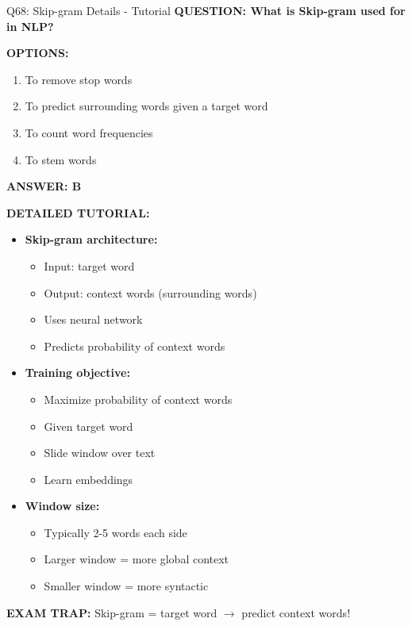 \documentclass[8pt]{beamer}
\begin{document}
	\begin{frame}{Q68: Skip-gram Details - Tutorial}
		\fontsize{6.5}{7.5}\selectfont
		\textbf{QUESTION: What is Skip-gram used for in NLP?}
		
		\vspace{0.1cm}
		\textbf{OPTIONS:}
		\begin{enumerate}
			\item To remove stop words
			\item To predict surrounding words given a target word
			\item To count word frequencies
			\item To stem words
		\end{enumerate}
		
		\vspace{0.1cm}
		\textcolor{myblue}{\textbf{ANSWER: B}}
		
		\vspace{0.1cm}
		\textbf{DETAILED TUTORIAL:}
		\begin{itemize}
			\item \textbf{Skip-gram architecture:}
			\begin{itemize}
				\item Input: target word
				\item Output: context words (surrounding words)
				\item Uses neural network
				\item Predicts probability of context words
			\end{itemize}
			\item \textbf{Training objective:}
			\begin{itemize}
				\item Maximize probability of context words
				\item Given target word
				\item Slide window over text
				\item Learn embeddings
			\end{itemize}
			\item \textbf{Window size:}
			\begin{itemize}
				\item Typically 2-5 words each side
				\item Larger window = more global context
				\item Smaller window = more syntactic
			\end{itemize}
		\end{itemize}
		
		\textcolor{myred}{\textbf{EXAM TRAP:}} Skip-gram = \textcolor{myblue}{target word $\to$ predict context words}!
	\end{frame}
	
\end{document}
